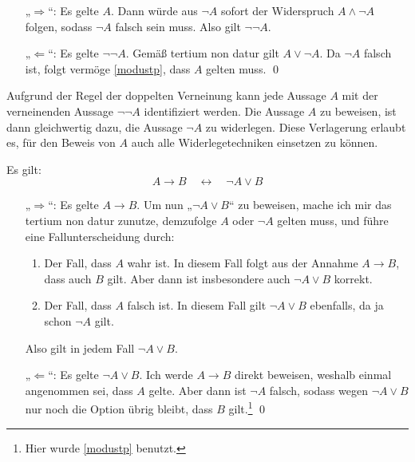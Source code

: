 \begin{bew}[(*)]
    \begin{itemize}
        \item[„$\Rightarrow$“:] Es gelte $A$. Dann würde aus $\neg A$ sofort der Widerspruch $A\land \neg A$ folgen, sodass $\neg A$ falsch sein muss. Also gilt $\neg\neg A$.
        \item[„$\Leftarrow$“:] Es gelte $\neg \neg A$. Gemäß tertium non datur gilt $A\lor \neg A$. Da $\neg A$ falsch ist, folgt vermöge \cref{modustp}, dass $A$ gelten muss. \qed
    \end{itemize}
\end{bew}


\begin{bem}
    Aufgrund der Regel der doppelten Verneinung kann jede Aussage $A$ mit der verneinenden Aussage $\neg\neg A$ identifiziert werden. Die Aussage $A$ zu beweisen, ist dann gleichwertig dazu, die Aussage $\neg A$ zu widerlegen. Diese Verlagerung erlaubt es, für den Beweis von $A$ auch alle Widerlegetechniken einsetzen zu können.
\end{bem}


\begin{satz} \label{implikationchar}
    Es gilt:
        \[ A\to B\quad \leftrightarrow\quad \neg A\lor B \]
\end{satz}


\begin{bew}[(*)]
    \begin{enumerate}
        \item[„$\Rightarrow$“:] Es gelte $A\to B$. Um nun „$\neg A\lor B$“ zu beweisen, mache ich mir das tertium non datur zunutze, demzufolge $A$ oder $\neg A$ gelten muss, und führe eine Fallunterscheidung durch:
        \begin{enumerate}[1)]
            \item Der Fall, dass $A$ wahr ist. In diesem Fall folgt aus der Annahme $A\to B$, dass auch $B$ gilt. Aber dann ist insbesondere auch $\neg A\lor B$ korrekt.
            \item Der Fall, dass $A$ falsch ist. In diesem Fall gilt $\neg A\lor B$ ebenfalls, da ja schon $\neg A$ gilt.
        \end{enumerate}
        Also gilt in jedem Fall $\neg A\lor B$.
        \item[„$\Leftarrow$“:] Es gelte $\neg A\lor B$. Ich werde $A\to B$ direkt beweisen, weshalb einmal angenommen sei, dass $A$ gelte. Aber dann ist $\neg A$ falsch, sodass wegen $\neg A\lor B$ nur noch die Option übrig bleibt, dass $B$ gilt.\footnote{Hier wurde \cref{modustp} benutzt.} \qed
    \end{enumerate}
\end{bew}



